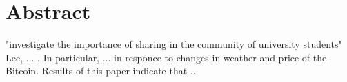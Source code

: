 %
%


\chapter*{Abstract}
\begin{SingleSpace}
 "investigate the importance of sharing in the community of university students" Lee, ... . In particular, ... in responce to changes in weather and price of the Bitcoin. Results of this paper indicate that ... 
\end{SingleSpace}
\clearpage